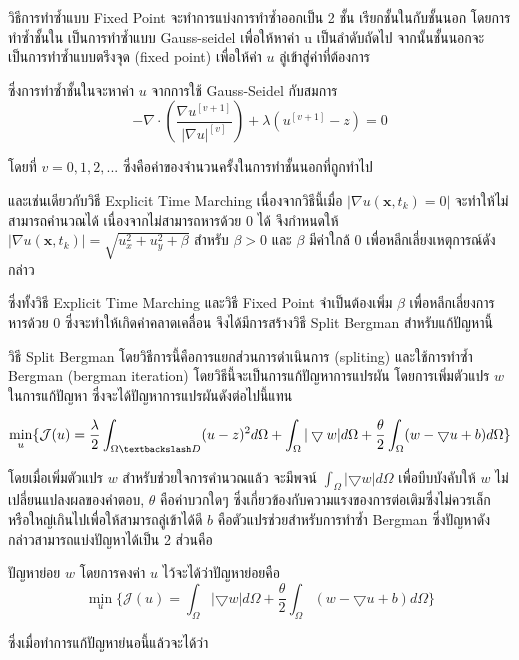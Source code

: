 \documentclass[hidelinks,a4paper,14pt]{article}
\numberwithin{equation}{section}							%
\begin{document}
{		วิธีการทำซ้ำแบบ Fixed Point \cite{ref:FixpointSolver} จะทำการแบ่งการทำซ้ำออกเป็น  2 ชั้น เรียกชั้นในกับชั้นนอก โดยการทำซ้ำชั้นใน เป็นการทำซ้ำแบบ Gauss-seidel เพื่อให้หาค่า u เป็นลำดับถัดไป จากนั้นชั้นนอกจะเป็นการทำซ้ำแบบตรึงจุด (fixed point) เพื่อให้ค่า $u$ ลู่เข้าสู่ค่าที่ต้องการ 
		
		ซึ่งการทำซ้ำชั้นในจะหาค่า $u$ จากการใช้ Gauss-Seidel กับสมการ
		$$
		- \nabla\cdot\left(\frac{\nabla u^{[v+1]}}{{\lvert \nabla u \rvert}^{[v]} }\right) + \lambda(u^{[v+1]}-z)  = 0
		$$
		
		โดยที่ $v = 0,1,2,... $ ซึ่งคือค่าของจำนวนครั้งในการทำชั้นนอกที่ถูกทำไป
		
		และเช่นเดียวกับวิธี Explicit Time Marching เนื่องจากวิธีนี้เมื่อ $\lvert \nabla u ( \mathbf{x},t_k) = 0\rvert $ จะทำให้ไม่สามารถคำนวณได้ เนื่องจากไม่สามารถหารด้วย 0 ได้ จึงกำหนดให้ $\lvert \nabla u ( \mathbf{x},t_k) \rvert = \sqrt{u_x^2+u_y^2 + \beta}$ สำหรับ $\beta > 0$ และ $\beta$ มีค่าใกล้ 0 เพื่อหลีกเลี่ยงเหตุการณ์ดังกล่าว
		
		ซึ่งทั้งวิธี Explicit Time Marching และวิธี Fixed Point จำเป็นต้องเพิ่ม $\beta$ เพื่อหลีกเลี่ยงการหารด้วย 0 ซึ่งจะทำให้เกิดค่าคลาดเคลื่อน  จึงได้มีการสร้างวิธี Split Bergman สำหรับแก้ปัญหานี้
		
		วิธี Split Bergman \cite{ref:splitbergman-inpaint} โดยวิธีการนี้คือการแยกส่วนการดำเนินการ (spliting) และใช้การทำซ้ำ Bergman (bergman iteration)  โดยวิธีนี้จะเป็นการแก้ปัญหาการแปรผัน โดยการเพิ่มตัวแปร $w$ ในการแก้ปัญหา ซึ่งจะได้ปัญหาการแปรผันดังต่อไปนี้แทน
		
			$$\min_{u} \{ \mathcal{J}(u) = \frac{\lambda}{2} \int_{\Omega \textbackslash D} (u-z)^2 d\Omega +  \int_{\Omega}  |\bigtriangledown w|  d\Omega + \frac{\theta}{2} \int_{\Omega} (w - \bigtriangledown u + b) d\Omega \}$$
			
			โดยเมื่อเพิ่มตัวแปร $w$ สำหรับช่วยใจการคำนวณแล้ว จะมีพจน์ $ \int_{\Omega}  |\bigtriangledown w|  d\Omega$ เพื่อบีบบังคับให้ $w$ ไม่เปลี่ยนแปลงผลของคำตอบ, $\theta$ คือค่าบวกใดๆ ซึ่งเกี่ยวข้องกับความแรงของการต่อเติมซึ่งไม่ควรเล็กหรือใหญ่เกินไปเพื่อให้สามารถลู่เข้าได้ดี $b$ คือตัวแปรช่วยสำหรับการทำซ้ำ Bergman ซึ่งปัญหาดังกล่าวสามารถแบ่งปัญหาได้เป็น 2 ส่วนคือ
			
			ปัญหาย่อย $w$ โดยการคงค่า $u$ ไว้จะได้ว่าปัญหาย่อยคือ
			$$\min_{u} \{ \mathcal{J}(u) =  \int_{\Omega}  |\bigtriangledown w|  d\Omega + \frac{\theta}{2} \int_{\Omega} (w - \bigtriangledown u + b) d\Omega \}$$
			
			ซึ่งเมื่อทำการแก้ปัญหาย่นอนี้แล้วจะได้ว่า
			
}
\end{document}
